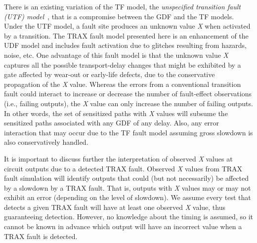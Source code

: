 There is an existing variation of the TF model, the \textit{unspecified transition fault (UTF) model}~\cite{pomeranz08}, that is a compromise between the GDF and the TF models.
%
Under the UTF model, a fault site produces an unknown value \textit{X} when activated by a transition.
%
The TRAX fault model presented here is an enhancement of the UDF model and includes fault activation due to glitches resulting from hazards, noise, etc.
%
One advantage of this fault model is that the unknown value \textit{X} captures all the possible transport-delay changes that might be exhibited by a gate affected by wear-out or early-life defects, due to the conservative propagation of the \textit{X} value.
%
Whereas the errors from a conventional transition fault could interact to increase or decrease the number of fault-effect observations (i.e., failing outputs), the \textit{X} value can only increase the number of failing outputs.
%
In other words, the set of sensitized paths with \textit{X} values will subsume the sensitized paths associated with any GDF of any delay.
%
Also, any error interaction that may occur due to the TF fault model assuming gross slowdown is also conservatively handled.

It is important to discuss further the interpretation of observed \textit{X} values at circuit outputs due to a detected TRAX fault.
%
Observed \textit{X} values from TRAX fault simulation will identify outputs that could (but not necessarily) be affected by a slowdown by a TRAX fault.
%
That is, outputs with \textit{X} values may or may not exhibit an error (depending on the level of slowdown).
%
We assume every test that detects a given TRAX fault will have at least one observed \textit{X} value, thus guaranteeing detection.
%
However, no knowledge about the timing is assumed, so it cannot be known in advance which output will have an incorrect value when a TRAX fault is detected.


